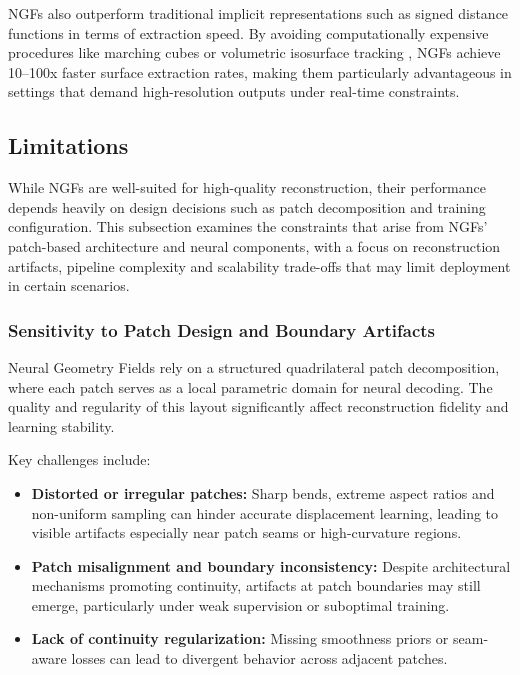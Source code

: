 NGFs also outperform traditional implicit representations such as signed distance functions in terms of extraction speed. 
By avoiding computationally expensive procedures like marching cubes or volumetric isosurface tracking \cite{mildenhall2020}, NGFs achieve 10--100x faster surface extraction rates, making them particularly advantageous in settings that demand high-resolution outputs under real-time constraints. 

\subsection{Limitations}

While NGFs are well-suited for high-quality reconstruction, their performance depends heavily on design decisions such as patch decomposition and training configuration. 
This subsection examines the constraints that arise from NGFs' patch-based architecture and neural components, with a focus on reconstruction artifacts, pipeline complexity and scalability trade-offs that may limit deployment in certain scenarios.

\subsubsection{Sensitivity to Patch Design and Boundary Artifacts}

Neural Geometry Fields rely on a structured quadrilateral patch decomposition, where each patch serves as a local parametric domain for neural decoding. 
The quality and regularity of this layout significantly affect reconstruction fidelity and learning stability. 

Key challenges include:
\begin{itemize}
    \item \textbf{Distorted or irregular patches:} Sharp bends, extreme aspect ratios and non-uniform sampling can hinder accurate displacement learning, leading to visible artifacts especially near patch seams or high-curvature regions.
    \item \textbf{Patch misalignment and boundary inconsistency:} Despite architectural mechanisms promoting continuity, artifacts at patch boundaries may still emerge, particularly under weak supervision or suboptimal training.
    \item \textbf{Lack of continuity regularization:} Missing smoothness priors or seam-aware losses can lead to divergent behavior across adjacent patches.
\end{itemize}

